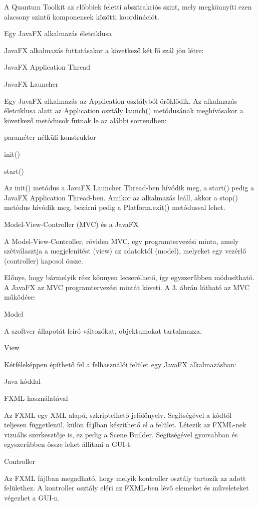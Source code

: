 A Quantum Toolkit az előbbiek feletti absztrakciós szint, mely megkönnyíti ezen alacsony szintű komponensek közötti koordinációt. 

Egy JavaFX alkalmazás életciklusa 

JavaFX alkalmazás futtatásakor a következő két fő szál jön létre: 

JavaFX Application Thread 

JavaFX Launcher 

Egy JavaFX alkalmazás az Application osztályból öröklődik. Az alkalmazás életciklusa alatt az Application osztály launch() metódusának meghívásakor a következő metódusok futnak le az alábbi sorrendben: 

paraméter nélküli konstruktor 

init() 

start() 

Az init() metódus a JavaFX Launcher Thread-ben hívódik meg, a start() pedig a JavaFX Application Thread-ben. Amikor az alkalmazás leáll, akkor a stop() metódus hívódik meg, bezárni pedig a Platform.exit() metódussal lehet.  

Model-View-Controller (MVC) és a JavaFX 

A Model-View-Controller, röviden MVC, egy programtervezési minta, amely szétválasztja a megjelenítést (view) az adatoktól (model), melyeket egy vezérlő (controller) kapcsol össze. 

Előnye, hogy bármelyik rész könnyen lecserélhető, így egyszerűbben módosítható. A JavaFX az MVC programtervezési mintát követi. A 3. ábrán látható az MVC működése: 


Model 

A szoftver állapotát leíró változókat, objektumokat tartalmazza. 

View 

Kétféleképpen építhető fel a felhasználói felület egy JavaFX alkalmazásban: 

Java kóddal 

FXML használatával 

Az FXML egy XML alapú, szkriptelhető jelölőnyelv. Segítségével a kódtól teljesen függetlenül, külön fájlban készíthető el a felület. Létezik az FXML-nek vizuális szerkesztője is, ez pedig a Scene Builder. Segítségével gyorsabban és egyszerűbben össze lehet állítani a GUI-t. 

Controller 

Az FXML fájlban megadható, hogy melyik kontroller osztály tartozik az adott felülethez. A kontroller osztály eléri az FXML-ben lévő elemeket és műveleteket végezhet a GUI-n. 